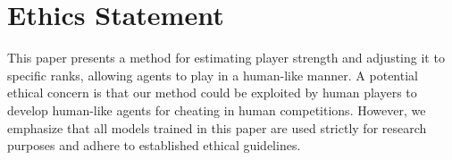 \section*{Ethics Statement}
\label{sec:ethics}

This paper presents a method for estimating player strength and adjusting it to specific ranks, allowing agents to play in a human-like manner.
A potential ethical concern is that our method could be exploited by human players to develop human-like agents for cheating in human competitions.
However, we emphasize that all models trained in this paper are used strictly for research purposes and adhere to established ethical guidelines.




